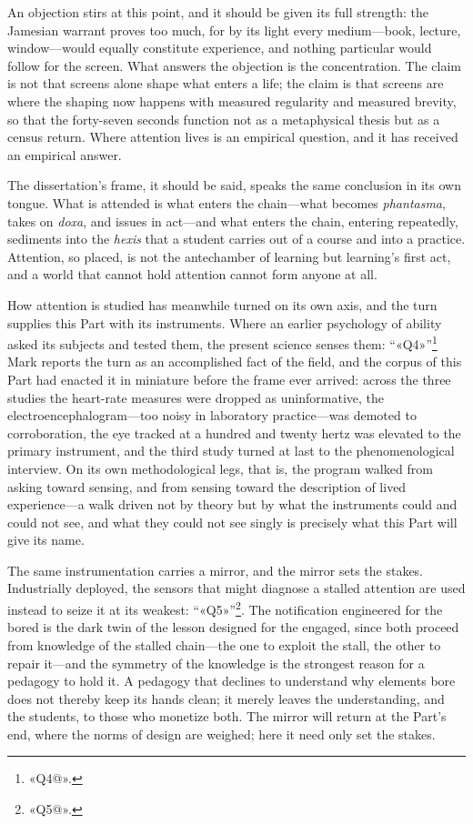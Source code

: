 An objection stirs at this point, and it should be given its full strength: the Jamesian warrant proves too much, for by its light every medium---book, lecture, window---would equally constitute experience, and nothing particular would follow for the screen. What answers the objection is the concentration. The claim is not that screens alone shape what enters a life; the claim is that screens are where the shaping now happens with measured regularity and measured brevity, so that the forty-seven seconds function not as a metaphysical thesis but as a census return. Where attention lives is an empirical question, and it has received an empirical answer.

The dissertation's frame, it should be said, speaks the same conclusion in its own tongue. What is attended is what enters the chain---what becomes \textit{phantasma}, takes on \textit{doxa}, and issues in act---and what enters the chain, entering repeatedly, sediments into the \textit{hexis} that a student carries out of a course and into a practice. Attention, so placed, is not the antechamber of learning but learning's first act, and a world that cannot hold attention cannot form anyone at all.

How attention is studied has meanwhile turned on its own axis, and the turn supplies this Part with its instruments. Where an earlier psychology of ability asked its subjects and tested them, the present science senses them: ``«Q4»''\footnote{«Q4@».} Mark reports the turn as an accomplished fact of the field, and the corpus of this Part had enacted it in miniature before the frame ever arrived: across the three studies the heart-rate measures were dropped as uninformative, the electroencephalogram---too noisy in laboratory practice---was demoted to corroboration, the eye tracked at a hundred and twenty hertz was elevated to the primary instrument, and the third study turned at last to the phenomenological interview. On its own methodological legs, that is, the program walked from asking toward sensing, and from sensing toward the description of lived experience---a walk driven not by theory but by what the instruments could and could not see, and what they could not see singly is precisely what this Part will give its name.

The same instrumentation carries a mirror, and the mirror sets the stakes. Industrially deployed, the sensors that might diagnose a stalled attention are used instead to seize it at its weakest: ``«Q5»''\footnote{«Q5@».}. The notification engineered for the bored is the dark twin of the lesson designed for the engaged, since both proceed from knowledge of the stalled chain---the one to exploit the stall, the other to repair it---and the symmetry of the knowledge is the strongest reason for a pedagogy to hold it. A pedagogy that declines to understand why elements bore does not thereby keep its hands clean; it merely leaves the understanding, and the students, to those who monetize both. The mirror will return at the Part's end, where the norms of design are weighed; here it need only set the stakes.

